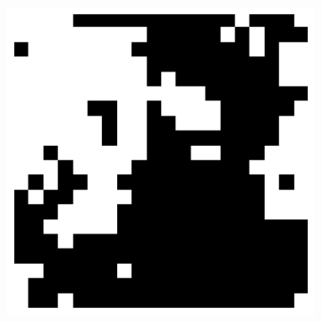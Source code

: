 \documentclass[11pt, a4paper]{report} %
\begin{document}
\begin{figure}[htb]
\begin{subfigure}[c]{0.2\linewidth}
	\end{subfigure}
	~
	\begin{subfigure}[c]{0.2\linewidth}
		\includegraphics[width=\linewidth]{20_by_20_Lattice_step5000_T=24.pdf}
	\end{subfigure}


\end{figure}
\end{document}
